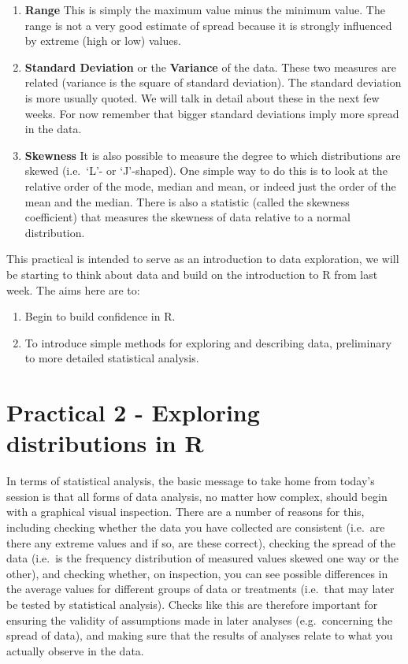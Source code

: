 \documentclass[
]{book}
\begin{document}
\begin{enumerate}
\def\labelenumi{\arabic{enumi})}
\item
  \textbf{Range} This is simply the maximum value minus the minimum value. The range is not a very good estimate of spread because it is strongly influenced by extreme (high or low) values.
\item
  \textbf{Standard Deviation} or the \textbf{Variance} of the data. These two measures are related (variance is the square of standard deviation). The standard deviation is more usually quoted. We will talk in detail about these in the next few weeks. For now remember that bigger standard deviations imply more spread in the data.
\item
  \textbf{Skewness} It is also possible to measure the degree to which distributions are skewed (i.e.~`L'- or `J'-shaped). One simple way to do this is to look at the relative order of the mode, median and mean, or indeed just the order of the mean and the median. There is also a statistic (called the skewness coefficient) that measures the skewness of data relative to a normal distribution.
\end{enumerate}

This practical is intended to serve as an introduction to data exploration, we will be starting to think about data and build on the introduction to R from last week. The aims here are to:

\begin{enumerate}
\def\labelenumi{\arabic{enumi})}
\item
  Begin to build confidence in R.
\item
  To introduce simple methods for exploring and describing data, preliminary to more detailed statistical analysis.
\end{enumerate}

\section{Practical 2 - Exploring distributions in R}\label{practical-2---exploring-distributions-in-r}

In terms of statistical analysis, the basic message to take home from today's session is that all forms of data analysis, no matter how complex, should begin with a graphical visual inspection. There are a number of reasons for this, including checking whether the data you have collected are consistent (i.e.~are there any extreme values and if so, are these correct), checking the spread of the data (i.e.~is the frequency distribution of measured values skewed one way or the other), and checking whether, on inspection, you can see possible differences in the average values for different groups of data or treatments (i.e.~that may later be tested by statistical analysis). Checks like this are therefore important for ensuring the validity of assumptions made in later analyses (e.g.~concerning the spread of data), and making sure that the results of analyses relate to what you actually observe in the data.
\end{document}
